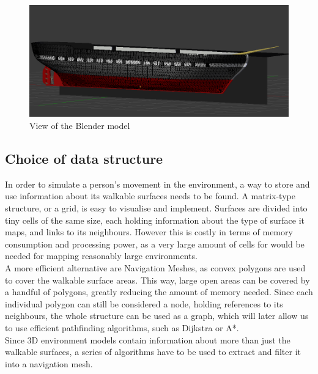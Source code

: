 \begin{figure}[H]
	\centering
	\includegraphics[width=1\textwidth]{../images/wireframe.png}
	\caption{View of the Blender model}
\end{figure}

\subsection {Choice of data structure}
In order to simulate a person's movement in the environment, a way to store and use information about its walkable surfaces needs to be found.
A matrix-type structure, or a grid, is easy to visualise and implement. Surfaces are divided into tiny cells of the same size, each holding information about the type of surface it maps, and links to its neighbours. However this is costly in terms of memory consumption and processing power, as a very large amount of cells for would be needed for mapping reasonably large environments.\\
A more efficient alternative are Navigation Meshes, as convex polygons are used to cover the walkable surface areas. This way, large open areas can be covered by a handful of polygons, greatly reducing the amount of memory needed. Since each individual polygon can still be considered a node, holding references to its neighbours, the whole structure can be used as a graph, which will later allow us to use efficient pathfinding algorithms, such as Dijkstra or A*.\\
Since 3D environment models contain information about more than just the walkable surfaces, a series of algorithms have to be used to extract and filter it into a navigation mesh.



